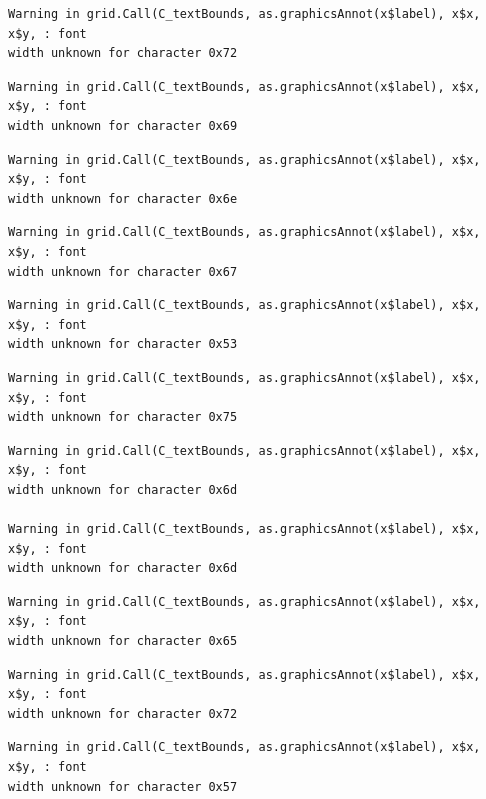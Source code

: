 \documentclass[
  letterpaper,
  DIV=11,
  numbers=noendperiod]{scrreprt}
\begin{document}
\begin{verbatim}
Warning in grid.Call(C_textBounds, as.graphicsAnnot(x$label), x$x, x$y, : font
width unknown for character 0x72
\end{verbatim}

\begin{verbatim}
Warning in grid.Call(C_textBounds, as.graphicsAnnot(x$label), x$x, x$y, : font
width unknown for character 0x69
\end{verbatim}

\begin{verbatim}
Warning in grid.Call(C_textBounds, as.graphicsAnnot(x$label), x$x, x$y, : font
width unknown for character 0x6e
\end{verbatim}

\begin{verbatim}
Warning in grid.Call(C_textBounds, as.graphicsAnnot(x$label), x$x, x$y, : font
width unknown for character 0x67
\end{verbatim}

\begin{verbatim}
Warning in grid.Call(C_textBounds, as.graphicsAnnot(x$label), x$x, x$y, : font
width unknown for character 0x53
\end{verbatim}

\begin{verbatim}
Warning in grid.Call(C_textBounds, as.graphicsAnnot(x$label), x$x, x$y, : font
width unknown for character 0x75
\end{verbatim}

\begin{verbatim}
Warning in grid.Call(C_textBounds, as.graphicsAnnot(x$label), x$x, x$y, : font
width unknown for character 0x6d

Warning in grid.Call(C_textBounds, as.graphicsAnnot(x$label), x$x, x$y, : font
width unknown for character 0x6d
\end{verbatim}

\begin{verbatim}
Warning in grid.Call(C_textBounds, as.graphicsAnnot(x$label), x$x, x$y, : font
width unknown for character 0x65
\end{verbatim}

\begin{verbatim}
Warning in grid.Call(C_textBounds, as.graphicsAnnot(x$label), x$x, x$y, : font
width unknown for character 0x72
\end{verbatim}

\begin{verbatim}
Warning in grid.Call(C_textBounds, as.graphicsAnnot(x$label), x$x, x$y, : font
width unknown for character 0x57
\end{verbatim}
\end{document}
